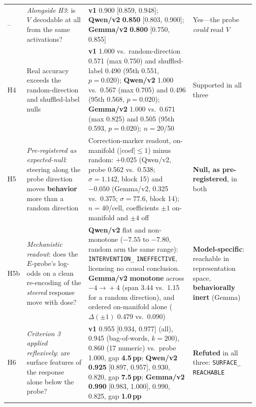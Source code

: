 \begin{table}[h]
\begin{scriptsize}
\begin{tabular}{@{}p{0.24in}p{1.30in}p{2.55in}p{0.87in}@{}}
\addlinespace[1pt]
-- & \emph{Alongside H3}: is $V$ decodable at all from the same activations? & \textbf{v1} 0.900 [0.859, 0.948]; \textbf{Qwen/v2} \textbf{0.850} [0.803, 0.900]; \textbf{Gemma/v2} \textbf{0.800} [0.750, 0.855] & Yes---the probe \emph{could} read $V$ \\
\addlinespace[1pt]
H4 & Real accuracy exceeds the random-direction and shuffled-label nulls & \textbf{v1} 1.000 vs.\ random-direction 0.571 (max 0.750) and shuffled-label 0.490 (95th 0.551, $p\!=\!0.020$); \textbf{Qwen/v2} 1.000 vs.\ 0.567 (max 0.705) and 0.496 (95th 0.568, $p\!=\!0.020$); \textbf{Gemma/v2} 1.000 vs.\ 0.671 (max 0.825) and 0.505 (95th 0.593, $p\!=\!0.020$); $n\!=\!20$/50 & Supported in all three \\
\addlinespace[1pt]
H5 & \emph{Pre-registered as expected-null}: steering along the probe direction moves \textbf{behavior} more than a random direction & Correction-marker readout, on-manifold ($|$coef$|\!\leq\!1$) minus random: \textbf{$+0.025$} (Qwen/v2, probe 0.562 vs.\ 0.538; $\sigma\!=\!1.142$, block 15) and \textbf{$-0.050$} (Gemma/v2, 0.325 vs.\ 0.375; $\sigma\!=\!77.6$, block 14); $n\!=\!40$/cell, coefficients $\pm1$ on-manifold and $\pm4$ off & \textbf{Null, as pre-registered}, in both \\
\addlinespace[1pt]
H5b & \emph{Mechanistic readout}: does the $E$-probe's log-odds on a clean re-encoding of the \emph{steered} response move with dose? & \textbf{Qwen/v2} flat and non-monotone ($-7.55$ to $-7.80$, random arm the same range): \texttt{INTERVENTION\_} \texttt{INEFFECTIVE}, licensing no causal conclusion. \textbf{Gemma/v2} \textbf{monotone} across $-4\!\to\!+4$ (span 3.44 vs.\ 1.15 for a random direction), and ordered on-manifold alone ($\Delta(\pm1)$ 0.479 vs.\ 0.090) & \textbf{Model-specific}: reachable in representation space, \textbf{behaviorally inert} (Gemma) \\
\addlinespace[1pt]
H6 & \emph{Criterion 3 applied reflexively}: are surface features of the response alone below the probe? & \textbf{v1} 0.955 [0.934, 0.977] (all), 0.945 (bag-of-words, $k\!=\!200$), 0.860 (17 numeric) vs.\ probe 1.000, gap \textbf{4.5\,pp}; \textbf{Qwen/v2} \textbf{0.925} [0.897, 0.957], 0.930, 0.820, gap \textbf{7.5\,pp}; \textbf{Gemma/v2} \textbf{0.990} [0.983, 1.000], 0.990, 0.825, gap \textbf{1.0\,pp} & \textbf{Refuted} in all three: \texttt{SURFACE\_} \texttt{REACHABLE} \\
\bottomrule
\end{tabular}
\end{scriptsize}
\end{table}

